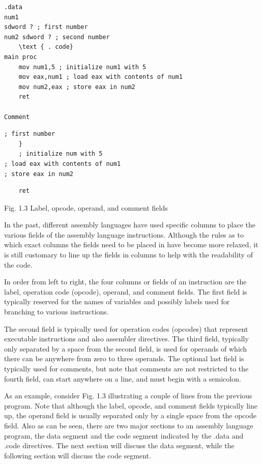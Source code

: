 \documentclass[10pt]{book}
\begin{document}
\begin{verbatim}
.data
num1
sdword ? ; first number
num2 sdword ? ; second number
    \text { . code}
main proc
    mov num1,5 ; initialize num1 with 5
    mov eax,num1 ; load eax with contents of num1
    mov num2,eax ; store eax in num2
    ret

Comment
\end{verbatim}

\begin{verbatim}
; first number
    }
    ; initialize num with 5
; load eax with contents of num1
; store eax in num2
\end{verbatim}

\begin{verbatim}
    ret
\end{verbatim}

Fig. 1.3 Label, opcode, operand, and comment fields

In the past, different assembly languages have used specific columns to place the various fields of the assembly language instructions. Although the rules as to which exact columns the fields need to be placed in have become more relaxed, it is still customary to line up the fields in columns to help with the readability of the code.


In order from left to right, the four columns or fields of an instruction are the label, operation code (opcode), operand, and comment fields. The first field is typically reserved for the names of variables and possibly labels used for branching to various instructions.

The second field is typically used for operation codes (opcodes) that represent executable instructions and also assembler directives. The third field, typically only separated by a space from the second field, is used for operands of which there can be anywhere from zero to three operands. The optional last field is typically used for comments, but note that comments are not restricted to the fourth field, can start anywhere on a line, and must begin with a semicolon.

As an example, consider Fig. 1.3 illustrating a couple of lines from the previous program. Note that although the label, opcode, and comment fields typically line up, the operand field is usually separated only by a single space from the opcode field. Also as can be seen, there are two major sections to an assembly language program, the data segment and the code segment indicated by the .data and .code directives. The next section will discuss the data segment, while the following section will discuss the code segment.
\end{document}
